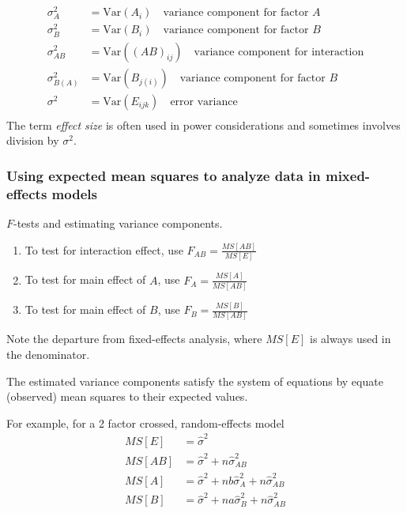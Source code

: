 $$
\begin{aligned}
\sigma_A^2 &= \mbox{Var}(A_i) \quad \mbox{variance component for factor $A$}\\
\sigma_B^2 &= \mbox{Var}(B_i) \quad \mbox{variance component for factor $B$}\\
\sigma_{AB}^2 &= \mbox{Var}((AB)_{ij}) \quad \mbox{variance component for interaction}\\
\sigma_{B(A)}^2 &= \mbox{Var}(B_{j(i)}) \quad \mbox{variance component for factor $B$}\\
\sigma^2 &= \mbox{Var}(E_{ijk}) \quad \mbox{error variance}\\
\end{aligned}
$$
The term {\it effect size} is often used in power considerations and sometimes involves division by $\sigma^2$.

\subsubsection*{Using expected mean squares to analyze data in mixed-effects models}

$F$-tests and estimating variance components.
\begin{enumerate}
	\item To test for interaction effect, use $F_{AB} = \frac{MS[AB]}{MS[E]}$
	\item To test for main effect of $A$, use $F_A = \frac{MS[A]}{MS[AB]}$
	\item To test for main effect of $B$, use $F_B = \frac{MS[B]}{MS[AB]}$
\end{enumerate}
Note the departure from fixed-effects analysis, where $MS[E]$ is always used in the denominator.

The estimated variance components satisfy the system of equations by equate (observed) mean squares to their expected values.

For example, for a 2 factor crossed, random-effects model
$$
\begin{aligned}
	MS[E] &= \hat{\sigma}^2\\
	MS[AB] &= \hat{\sigma}^2 + n \hat{\sigma}_{AB}^2\\
	MS[A] &= \hat{\sigma}^2 + nb\hat{\sigma}_A^2 + n\hat{\sigma}_{AB}^2\\
	MS[B] &= \hat{\sigma}^2 + na\hat{\sigma}_B^2 + n\hat{\sigma}_{AB}^2\\	
\end{aligned}
$$

